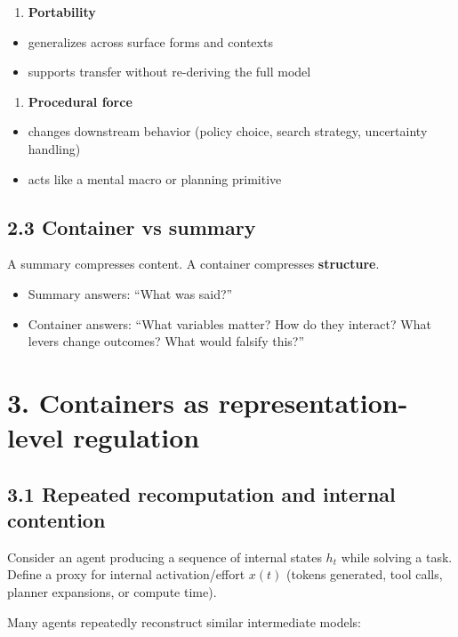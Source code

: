 \documentclass[11pt]{article}
\begin{document}
\begin{enumerate}[label=\arabic*)]
\item \textbf{Portability}
\end{enumerate}
\begin{itemize}
\item generalizes across surface forms and contexts
\item supports transfer without re-deriving the full model
\end{itemize}

\begin{enumerate}[label=\arabic*)]
\item \textbf{Procedural force}
\end{enumerate}
\begin{itemize}
\item changes downstream behavior (policy choice, search strategy, uncertainty handling)
\item acts like a mental macro or planning primitive
\end{itemize}

\subsection*{2.3 Container vs summary}
A summary compresses content. A container compresses \textbf{structure}.

\begin{itemize}
\item Summary answers: “What was said?”
\item Container answers: “What variables matter? How do they interact? What levers change outcomes? What would falsify this?”
\end{itemize}

\section*{3. Containers as representation-level regulation}

\subsection*{3.1 Repeated recomputation and internal contention}
Consider an agent producing a sequence of internal states \(h_t\) while solving a task. Define a proxy for internal activation/effort \(x(t)\) (tokens generated, tool calls, planner expansions, or compute time).

Many agents repeatedly reconstruct similar intermediate models:
\end{document}
